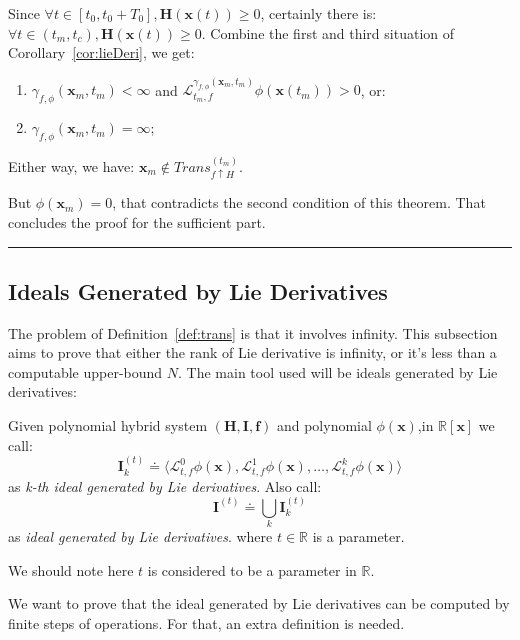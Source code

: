 \documentclass{jssc}
\newcommand{\rulex}{\hfill\rule{1mm}{3mm}}
\begin{document}
Since $\forall t \in [t_0, t_0 + T_0], \boldsymbol{H}(\boldsymbol{x}(t)) \geq 0$, certainly there is: $\forall t \in (t_m, t_c),\boldsymbol{H}(\boldsymbol{x}(t)) \geq 0$. Combine the first and third situation of Corollary~\ref{cor:lieDeri}, we get:
\begin{enumerate}
	\item $\gamma_{f, \phi}(\boldsymbol{x}_m, t_m) < \infty$ and $\mathcal{L}_{t_m, f}^{\gamma_{f, \phi}(\boldsymbol{x}_m, t_m)} \phi (\boldsymbol{x}(t_m)) > 0$, or:
	\item $\gamma_{f, \phi}(\boldsymbol{x}_m, t_m) = \infty$;
\end{enumerate}
Either way, we have: $\boldsymbol{x}_m \notin Trans_{f \uparrow H}^{(t_m)}$.

But $\phi(\boldsymbol{x}_m) = 0$, that contradicts the second condition of this theorem. That concludes the proof for the sufficient part.
\rulex

\subsection{Ideals Generated by Lie Derivatives}
\label{sub:original}
The problem of Definition~\ref{def:trans} is that it involves infinity. This subsection aims to prove that either the rank of Lie derivative is infinity, or it's less than a computable upper-bound $N$. The main tool used will be ideals generated by Lie derivatives:

\begin{definition}
\label{def:lieIdeal}
Given polynomial hybrid system $(\boldsymbol{H}, \boldsymbol{I}, \boldsymbol{f})$ and polynomial $\phi(\boldsymbol{x})$,in $\mathbb{R}[\boldsymbol{x}]$ we call:
		\begin{equation*}
			\boldsymbol{I}_k^{(t)} \doteq \langle \mathcal{L}_{t, f}^0 \phi(\boldsymbol{x}), \mathcal{L}_{t, f}^1 \phi(\boldsymbol{x}), \dots, \mathcal{L}_{t, f}^k \phi(\boldsymbol{x}) \rangle
		\end{equation*}
		as \emph{k-th ideal generated by Lie derivatives}. Also call:
		\begin{equation*}
			\boldsymbol{I}^{(t)} \doteq \bigcup_k \boldsymbol{I}_k^{(t)}
		\end{equation*}
		as \emph{ideal generated by Lie derivatives}. where $t \in \mathbb{R}$ is a parameter.
\end{definition}
We should note here $t$ is considered to be a parameter in $\mathbb{R}$.

We want to prove that the ideal generated by Lie derivatives can be computed by finite steps of operations. For that, an extra definition is needed.
\end{document}
